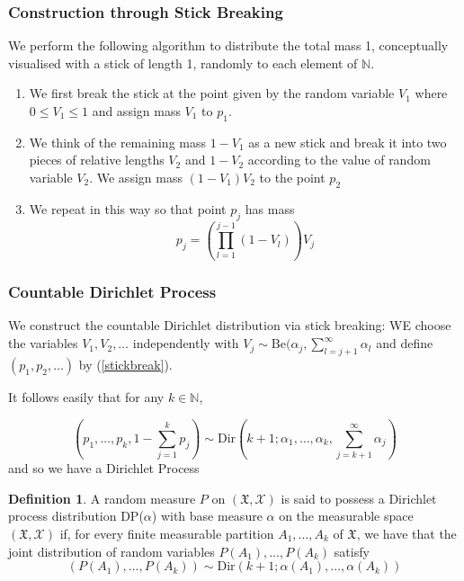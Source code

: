 \documentclass[a4paper,11pt]{article}
\theoremstyle{theorem}
\theoremstyle{definition}
\newtheorem{defn}{Definition}[section]
\begin{document}
\subsubsection{Construction through Stick Breaking}

We perform the following algorithm to distribute the total mass 1, conceptually visualised with a stick of length 1, randomly to each element of $\mathbb{N}$.
\begin{enumerate}
\item We first break the stick at the point given by the random variable $V_1$ where $0 \leq V_1 \leq 1$ and assign mass $V_1$ to $p_1$.
\item We think of the remaining mass $1 - V_1$ as a new stick and break it into two pieces of relative lengths $V_2$ and $1 - V_2$ according to the value of random variable $V_2$. We assign mass $(1 - V_1)V_2$ to the point $p_2$
\item We repeat in this way so that point $p_j$ has mass
\begin{equation} \label{stickbreak}
p_j = \left(\prod_{l=1}^{j-1}{(1-V_l)}\right)V_j
\end{equation}

\end{enumerate}

\subsubsection{Countable Dirichlet Process}

We construct the countable Dirichlet distribution via stick breaking:
WE choose the variables $V_1, V_2, \dotsc$ independently with $V_j \sim \text{Be}(\alpha_j, \sum_{l=j+1}^{\infty}{\alpha_l}$ and define $(p_1, p_2, \dotsc )$ by (\ref{stickbreak}).

It follows easily that for any $k \in \mathbb{N}$,

\begin{equation}
\left(p_1, \dotsc, p_k, 1 - \sum_{j=1}^{k}{p_j}\right) \sim \text{Dir}\left(k+1; \alpha_1, \dotsc, \alpha_k, \sum_{j=k+1}^{\infty}{\alpha_j}\right)
\end{equation}
and so we have a Dirichlet Process

\begin{defn}
A random measure $P$ on $(\mathfrak{X}, \mathcal{X})$ is said to possess a Dirichlet process distribution DP($\alpha$) with base measure $\alpha$ on the measurable space $(\mathfrak{X}, \mathcal{X})$ if, for every finite measurable partition $A_1, \dotsc, A_k$ of $\mathfrak{X}$, we have that the joint distribution of random variables $P(A_1), \dotsc, P(A_k)$ satisfy
\[
(P(A_1), \dotsc, P(A_k)) \sim \text{Dir}\left(k+1; \alpha(A_1), \dotsc, \alpha(A_k)\right) 
\]
\end{defn}
\end{document}
